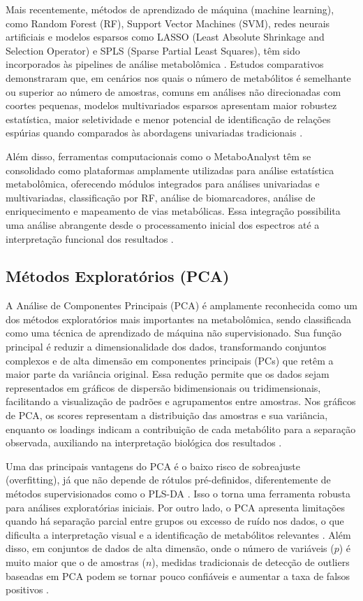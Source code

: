 Mais recentemente, métodos de aprendizado de máquina (machine learning), como Random Forest (RF), Support Vector Machines (SVM), redes neurais artificiais e modelos esparsos como LASSO (Least Absolute Shrinkage and Selection Operator) e SPLS (Sparse Partial Least Squares), têm sido incorporados às pipelines de análise metabolômica \cite{anwardeen2023statistical}. Estudos comparativos demonstraram que, em cenários nos quais o número de metabólitos é semelhante ou superior ao número de amostras, comuns em análises não direcionadas com coortes pequenas, modelos multivariados esparsos apresentam maior robustez estatística, maior seletividade e menor potencial de identificação de relações espúrias quando comparados às abordagens univariadas tradicionais \cite{henglin2022quantitative}.

Além disso, ferramentas computacionais como o MetaboAnalyst têm se consolidado como plataformas amplamente utilizadas para análise estatística metabolômica, oferecendo módulos integrados para análises univariadas e multivariadas, classificação por RF, análise de biomarcadores, análise de enriquecimento e mapeamento de vias metabólicas. Essa integração possibilita uma análise abrangente desde o processamento inicial dos espectros até a interpretação funcional dos resultados \cite{pang2024metaboanalyst}.

\subsection{Métodos Exploratórios (PCA)}

A Análise de Componentes Principais (PCA) é amplamente reconhecida como um dos métodos exploratórios mais importantes na metabolômica, sendo classificada como uma técnica de aprendizado de máquina não supervisionado. Sua função principal é reduzir a dimensionalidade dos dados, transformando conjuntos complexos e de alta dimensão em componentes principais (PCs) que retêm a maior parte da variância original. Essa redução permite que os dados sejam representados em gráficos de dispersão bidimensionais ou tridimensionais, facilitando a visualização de padrões e agrupamentos entre amostras. Nos gráficos de PCA, os scores representam a distribuição das amostras e sua variância, enquanto os loadings indicam a contribuição de cada metabólito para a separação observada, auxiliando na interpretação biológica dos resultados \cite{mayonu2026evaluation}.

Uma das principais vantagens do PCA é o baixo risco de sobreajuste (overfitting), já que não depende de rótulos pré-definidos, diferentemente de métodos supervisionados como o PLS-DA \cite{jiang2022principal}. Isso o torna uma ferramenta robusta para análises exploratórias iniciais. Por outro lado, o PCA apresenta limitações quando há separação parcial entre grupos ou excesso de ruído nos dados, o que dificulta a interpretação visual e a identificação de metabólitos relevantes \cite{mayonu2026evaluation}. Além disso, em conjuntos de dados de alta dimensão, onde o número de variáveis ($p$) é muito maior que o de amostras ($n$), medidas tradicionais de detecção de outliers baseadas em PCA podem se tornar pouco confiáveis e aumentar a taxa de falsos positivos \cite{brini2021improved}.

